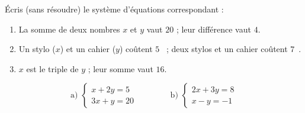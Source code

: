 \documentclass[11pt,a4paper]{article}
\newcommand{\euro}{\texteuro}
\begin{document}
\begin{exo}
Écris (sans résoudre) le système d'équations correspondant :
\begin{enumerate}[label=\alph*),leftmargin=2em,topsep=1pt,itemsep=1pt]
  \item La somme de deux nombres $x$ et $y$ vaut $20$ ; leur différence vaut $4$.
  \item Un stylo ($x$) et un cahier ($y$) coûtent $5$~\euro{} ; deux stylos et un cahier coûtent $7$~\euro.
  \item $x$ est le triple de $y$ ; leur somme vaut $16$.
\end{enumerate}
\end{exo}

\begin{exo}
\[ \text{a) }\begin{cases} x+2y=5\\ 3x+y=20\end{cases}\qquad\qquad
   \text{b) }\begin{cases} 2x+3y=8\\ x-y=-1\end{cases} \]
\end{exo}
\end{document}
